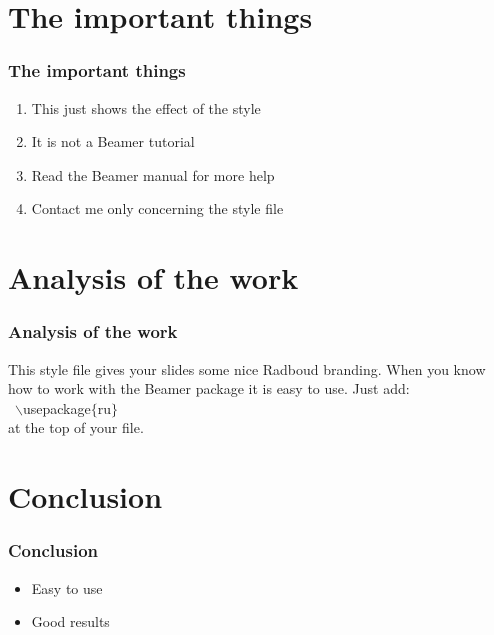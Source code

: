 \documentclass[a4paper,12pt,oneside]{beamer}
\begin{document}
\section{The important things}

\begin{frame}
  \frametitle{The important things}

  \begin{enumerate}
    \item This just shows the effect of the style
    \item It is not a Beamer tutorial
    \item Read the Beamer manual for more help
    \item Contact me only concerning the style file
  \end{enumerate}
\end{frame}

\section{Analysis of the work}

\begin{frame}
  \frametitle{Analysis of the work}

  This style file gives your slides some nice Radboud branding.
  When you know how to work with the Beamer package it is easy to use.
  Just add:\\~$\backslash$usepackage$\{$ru$\}$ \\ at the top of your file.
\end{frame}

\section{Conclusion}

\begin{frame}
  \frametitle{Conclusion}

  \begin{itemize}
    \item Easy to use
    \item Good results
  \end{itemize}
\end{frame}
\end{document}
